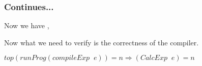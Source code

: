 \documentclass{beamer}
\begin{document}
\begin{frame}[fragile]
    \frametitle{Continues...}
    Now we have , 
    \begin{itemize}
    \end{itemize}

    {
        Now what we need to verify is the correctness of the compiler.
        
        $ top(runProg(compileExp \;\; e)) = n \Longrightarrow (CalcExp \;\; e) = n$
    }
    

\end{frame}
\end{document}
